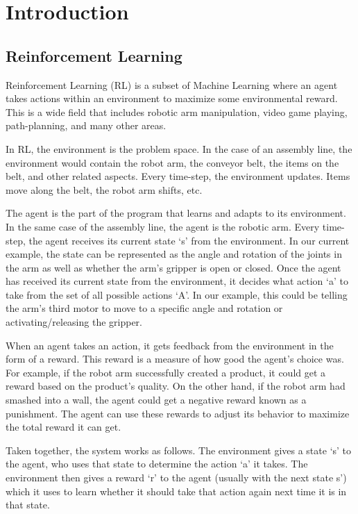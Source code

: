 \documentclass[12pt]{thesis}
\begin{document}
\body


\chapter{Introduction}
\section{Reinforcement Learning}
Reinforcement Learning (RL) is a subset of Machine Learning where an agent takes actions within an environment to maximize some environmental reward. This is a wide field that includes robotic arm manipulation, video game playing, path-planning, and many other areas.

In RL, the environment is the problem space. In the case of an assembly line, the environment would contain the robot arm, the conveyor belt, the items on the belt, and other related aspects. Every time-step, the environment updates. Items move along the belt, the robot arm shifts, etc.

The agent is the part of the program that learns and adapts to its environment. In the same case of the assembly line, the agent is the robotic arm. Every time-step, the agent receives its current state ‘s’ from the environment. In our current example, the state can be represented as the angle and rotation of the joints in the arm as well as whether the arm’s gripper is open or closed. Once the agent has received its current state from the environment, it decides what action ‘a’ to take from the set of all possible actions ‘A’. In our example, this could be telling the arm’s third motor to move to a specific angle and rotation or activating/releasing the gripper.

When an agent takes an action, it gets feedback from the environment in the form of a reward. This reward is a measure of how good the agent’s choice was. For example, if the robot arm successfully created a product, it could get a reward based on the product’s quality. On the other hand, if the robot arm had smashed into a wall, the agent could get a negative reward known as a punishment. The agent can use these rewards to adjust its behavior to maximize the total reward it can get.

Taken together, the system works as follows. The environment gives a state ‘s’ to the agent, who uses that state to determine the action ‘a’ it takes. The environment then gives a reward ‘r’ to the agent (usually with the next state s’) which it uses to learn whether it should take that action again next time it is in that state.
\end{document}
